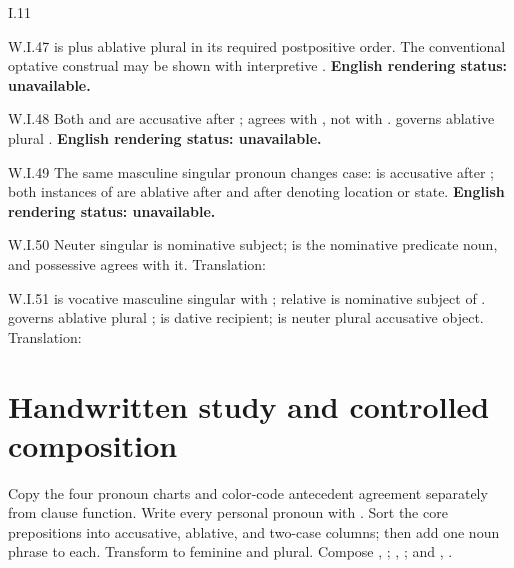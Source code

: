 \begin{courseunit}{I.11}
\begin{workedexample}{}{W.I.47}
 is  plus ablative plural  in its
required postpositive order. The conventional optative construal may be shown
with interpretive \Latin{[sit]}.
\textbf{English rendering status: unavailable.}
\end{workedexample}

\begin{workedexample}{}{W.I.48}
Both  and  are accusative after
;  agrees with , not with
.  governs ablative plural .
\textbf{English rendering status: unavailable.}
\end{workedexample}

\begin{workedexample}{}{W.I.49}
The same masculine singular pronoun changes case:  is accusative
after ; both instances of  are ablative after
 and after  denoting location or state.
\textbf{English rendering status: unavailable.}
\end{workedexample}

\begin{workedexample}{}{W.I.50}
Neuter singular  is nominative subject;  is the
nominative predicate noun, and possessive  agrees with it.
Translation: 
\end{workedexample}

\begin{workedexample}{}{W.I.51}
 is vocative masculine singular with ; relative
 is nominative subject of .  governs ablative
plural ;  is dative recipient;  is neuter plural accusative object. Translation: 
\end{workedexample}

\section{Handwritten study and controlled composition}

Copy the four pronoun charts and color-code antecedent agreement separately
from clause function. Write every personal pronoun with . Sort the
core prepositions into accusative, ablative, and two-case columns; then add one
noun phrase to each. Transform  to feminine and
plural. Compose , ;
, ; and , .



\end{courseunit}


